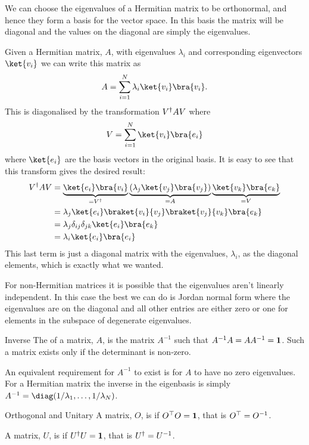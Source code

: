 We can choose the eigenvalues of a Hermitian matrix to be orthonormal, and hence they form a basis for the vector space.
In this basis the matrix will be diagonal and the values on the diagonal are simply the eigenvalues.

Given a Hermitian matrix, \(A\), with eigenvalues \(\lambda_i\) and corresponding eigenvectors \(\ket{v_i}\) we can write this matrix as
\begin{equation}
    A = \sum_{i=1}^{N} \lambda_i\ket{v_i}\bra{v_i}.
\end{equation}
This is diagonalised by the transformation \(V^\dagger A V\) where
\begin{equation}
    V = \sum_{i=1}^{N} \ket{v_i}\bra{e_i}
\end{equation}
where \(\ket{e_i}\) are the basis vectors in the original basis.
It is easy to see that this transform gives the desired result:
\begin{align}
    V^\hermit AV &= \underbrace{\ket{e_i}\bra{v_i}}_{=V^\hermit}  \underbrace{(\lambda_j \ket{v_j}\bra{v_j})}_{=A}\underbrace{\ket{v_k}\bra{e_k}}_{=V}\\
    &= \lambda_j \ket{e_i}\braket{v_i}{v_j}\braket{v_j}{v_k}\bra{e_k}\\
    &= \lambda_j \delta_{ij}\delta_{jk} \ket{e_i}\bra{e_k}\\
    &= \lambda_i \ket{e_i}\bra{e_i}
\end{align}
This last term is just a diagonal matrix with the eigenvalues, \(\lambda_i\), as the diagonal elements, which is exactly what we wanted.

For non-Hermitian matrices it is possible that the eigenvalues aren't linearly independent.
In this case the best we can do is Jordan normal form where the eigenvalues are on the diagonal and all other entries are either zero or one for elements in the subspace of degenerate eigenvalues.

\begin{dfn}{Inverse}{}
    The  of a matrix, \(A\), is the matrix \(A^{-1}\) such that \(A^{-1}A = AA^{-1} = \mathbf{1}\).
    Such a matrix exists only if the determinant is non-zero.
\end{dfn}

An equivalent requirement for \(A^{-1}\) to exist is for \(A\) to have no zero eigenvalues.
For a Hermitian matrix the inverse in the eigenbasis is simply \(A^{-1} = \diag(1/\lambda_1, \dotsc, 1/\lambda_N)\).

\begin{dfn}{Orthogonal and Unitary}{}
    A matrix, \(O\), is  if \(O^\top O = \mathbf{1}\), that is \(O^\top = O^{-1}\).
    
    A matrix, \(U\), is  if \(U^\dagger U = \mathbf{1}\), that is \(U^\dagger = U^{-1}\).
\end{dfn}

